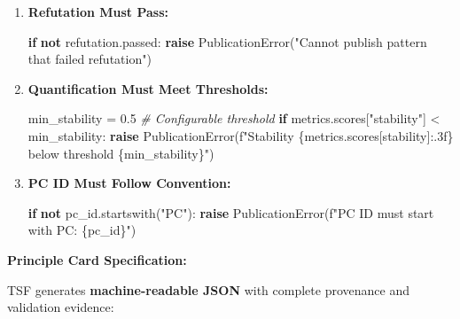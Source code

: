 \documentclass[
]{article}
\newenvironment{Shaded}{}{}
\newcommand{\CommentTok}[1]{\textcolor[rgb]{0.38,0.63,0.69}{\textit{#1}}}
\newcommand{\ControlFlowTok}[1]{\textcolor[rgb]{0.00,0.44,0.13}{\textbf{#1}}}
\newcommand{\FloatTok}[1]{\textcolor[rgb]{0.25,0.63,0.44}{#1}}
\newcommand{\KeywordTok}[1]{\textcolor[rgb]{0.00,0.44,0.13}{\textbf{#1}}}
\newcommand{\NormalTok}[1]{#1}
\newcommand{\OperatorTok}[1]{\textcolor[rgb]{0.40,0.40,0.40}{#1}}
\newcommand{\SpecialCharTok}[1]{\textcolor[rgb]{0.25,0.44,0.63}{#1}}
\newcommand{\SpecialStringTok}[1]{\textcolor[rgb]{0.73,0.40,0.53}{#1}}
\newcommand{\StringTok}[1]{\textcolor[rgb]{0.25,0.44,0.63}{#1}}
\begin{document}
\begin{enumerate}
\def\labelenumi{\arabic{enumi}.}
\item
  \textbf{Refutation Must Pass:}

\begin{Shaded}
\begin{Highlighting}[]
\ControlFlowTok{if} \KeywordTok{not}\NormalTok{ refutation.passed:}
    \ControlFlowTok{raise}\NormalTok{ PublicationError(}\StringTok{"Cannot publish pattern that failed refutation"}\NormalTok{)}
\end{Highlighting}
\end{Shaded}
\item
  \textbf{Quantification Must Meet Thresholds:}

\begin{Shaded}
\begin{Highlighting}[]
\NormalTok{min\_stability }\OperatorTok{=} \FloatTok{0.5}  \CommentTok{\# Configurable threshold}
\ControlFlowTok{if}\NormalTok{ metrics.scores[}\StringTok{"stability"}\NormalTok{] }\OperatorTok{\textless{}}\NormalTok{ min\_stability:}
    \ControlFlowTok{raise}\NormalTok{ PublicationError(}\SpecialStringTok{f"Stability }\SpecialCharTok{\{}\NormalTok{metrics}\SpecialCharTok{.}\NormalTok{scores[}\StringTok{\textquotesingle{}stability\textquotesingle{}}\NormalTok{]}\SpecialCharTok{:.3f\}}\SpecialStringTok{ below threshold }\SpecialCharTok{\{}\NormalTok{min\_stability}\SpecialCharTok{\}}\SpecialStringTok{"}\NormalTok{)}
\end{Highlighting}
\end{Shaded}
\item
  \textbf{PC ID Must Follow Convention:}

\begin{Shaded}
\begin{Highlighting}[]
\ControlFlowTok{if} \KeywordTok{not}\NormalTok{ pc\_id.startswith(}\StringTok{"PC"}\NormalTok{):}
    \ControlFlowTok{raise}\NormalTok{ PublicationError(}\SpecialStringTok{f"PC ID must start with \textquotesingle{}PC\textquotesingle{}: }\SpecialCharTok{\{}\NormalTok{pc\_id}\SpecialCharTok{\}}\SpecialStringTok{"}\NormalTok{)}
\end{Highlighting}
\end{Shaded}
\end{enumerate}

\textbf{Principle Card Specification:}

TSF generates \textbf{machine-readable JSON} with complete provenance
and validation evidence:
\end{document}

